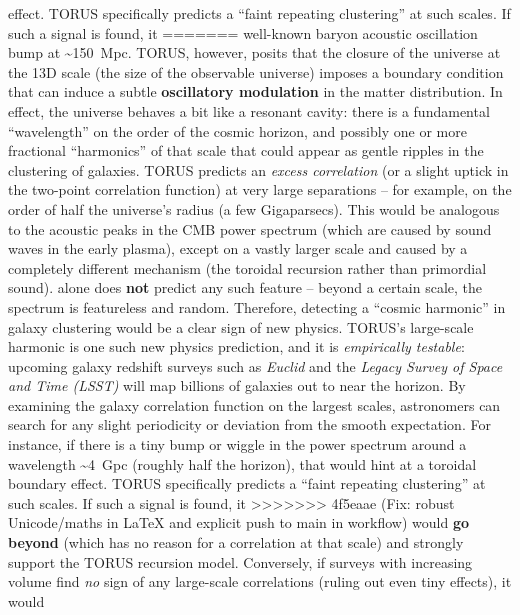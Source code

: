 \documentclass[]{article}
\begin{document}
\begin{itemize}
  effect\hspace{0pt}. TORUS specifically predicts a ``faint repeating
  clustering'' at such scales\hspace{0pt}. If such a signal is found, it
=======
  well-known baryon acoustic oscillation bump at
  \textasciitilde{}150~Mpc. TORUS, however, posits that the closure of
  the universe at the 13D scale (the size of the observable universe)
  imposes a boundary condition that can induce a subtle
  \textbf{oscillatory modulation} in the matter distribution​. In
  effect, the universe behaves a bit like a resonant cavity: there is a
  fundamental ``wavelength'' on the order of the cosmic horizon, and
  possibly one or more fractional ``harmonics'' of that scale that could
  appear as gentle ripples in the clustering of galaxies. TORUS predicts
  an \emph{excess correlation} (or a slight uptick in the two-point
  correlation function) at very large separations -- for example, on the
  order of half the universe's radius (a few Gigaparsecs)​. This would
  be analogous to the acoustic peaks in the CMB power spectrum (which
  are caused by sound waves in the early plasma), except on a vastly
  larger scale and caused by a completely different mechanism (the
  toroidal recursion rather than primordial sound).  alone does
  \textbf{not} predict any such feature -- beyond a certain scale, the
   spectrum is featureless and random. Therefore, detecting a
  ``cosmic harmonic'' in galaxy clustering would be a clear sign of new
  physics. TORUS's large-scale harmonic is one such new physics
  prediction, and it is \emph{empirically testable}: upcoming galaxy
  redshift surveys such as \emph{Euclid} and the \emph{Legacy Survey of
  Space and Time (LSST)} will map billions of galaxies out to near the
  horizon. By examining the galaxy correlation function on the largest
  scales, astronomers can search for any slight periodicity or deviation
  from the smooth  expectation​. For instance, if there is a tiny
  bump or wiggle in the power spectrum around a wavelength
  \textasciitilde{}4~Gpc (roughly half the horizon), that would hint at
  a toroidal boundary effect​. TORUS specifically predicts a ``faint
  repeating clustering'' at such scales​. If such a signal is found, it
>>>>>>> 4f5eaae (Fix: robust Unicode/maths in LaTeX and explicit push to main in workflow)
  would \textbf{go beyond } (which has no reason for a correlation
  at that scale) and strongly support the TORUS recursion model.
  Conversely, if surveys with increasing volume find \emph{no} sign of
  any large-scale correlations (ruling out even tiny effects), it would

\end{itemize}
\end{document}
